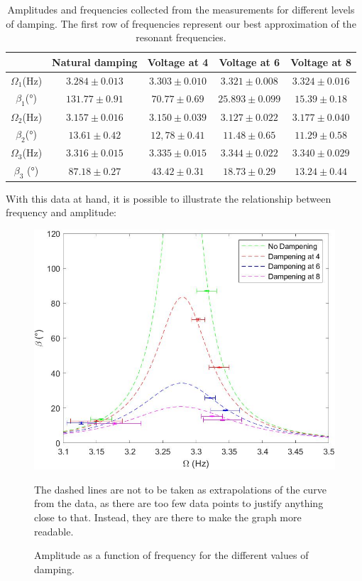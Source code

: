 \documentclass[a4paper,12pt]{article}
\begin{document}
\begin{table}[h!]
\caption{Amplitudes and frequencies collected from the measurements for different levels of damping. The first row of frequencies represent our best approximation of the resonant frequencies.}
\begin{tabular}{|c|c|c|c|c|}
     \hline
     &Natural damping &  Voltage at 4 & Voltage at 6 & Voltage at 8\\
     \hline
     $\Omega_1$(Hz) & $3.284 \pm 0.013$ &$3.303 \pm 0.010$ & $3.321 \pm 0.008$ & $3.324\pm 0.016$ \\
     \hline
     $\beta_1$(°) & $131.77 \pm 0.91$ & $70.77 \pm 0.69$ & $25.893 \pm 0.099$ & $15.39 \pm 0.18$\\
     \hline
     $\Omega_2$(Hz) & $3.157 \pm 0.016$ & $3.150 \pm 0.039$ & $3.127 \pm 0.022$ & $3.177\pm 0.040$\\
     \hline
     $\beta_2$(°) & $13.61\pm 0.42$ & $12,78 \pm 0.41$ & $11.48 \pm 0.65$ & $11.29\pm 0.58$\\
     \hline
     $\Omega_3 $(Hz) & $3.316 \pm 0.015 $ & $3.335 \pm 0.015$ & $3.344 \pm 0.022$ & $3.340 \pm 0.029$\\
     \hline
     $\beta_3$ (°) & $87.18 \pm 0.27$ & $43.42 \pm 0.31$ & $18.73 \pm 0.29$ & $13.24 \pm 0.44$\\
     \hline
\end{tabular}

\end{table}

With this data at hand, it is possible to illustrate the relationship between frequency and amplitude:

\begin{figure}[H]
    \centering 
    \caption{Amplitude as a function of frequency for the different values of damping.}
    \includegraphics[width=12cm]{forzado.jpg}
    
    The dashed lines are not to be taken as extrapolations of the curve from the data, as there are too few data points to justify anything close to that. Instead, they are there to make the graph more readable.
    \label{fig:forzado}
\end{figure}
\end{document}
